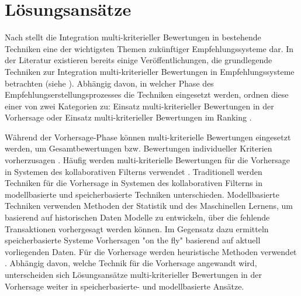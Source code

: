 
\section{Lösungsansätze}
\label{ch:erweiterungen:loesungen}
Nach \textcite[S. 853]{adomavicius:4:inbook} stellt die Integration multi-kriteriel\-ler Bewertungen in bestehende Techniken eine der wichtigsten Themen zukünftiger Empfehlungssysteme dar.
In der Literatur existieren bereits einige Veröffentlichungen, die grundlegende Techniken zur Integration multi-kriterieller Bewertungen in Empfehlungssysteme betrachten (siehe \cite{adomavicius:inproceedings:2}\cite{adomavicius:4:inbook}\cite{recommenderSystems:2016}).
Abhängig davon, in welcher Phase des Empfehlungserstellungsprozesses die Techniken eingesetzt werden, ordnen \textcite[S. 854f.]{adomavicius:4:inbook} diese einer von zwei Kategorien zu: Einsatz multi-kriterieller Bewertungen in der Vorhersage oder Einsatz multi-kriterieller Bewertungen im Ranking \cite[S. 854]{adomavicius:4:inbook}.

Während der Vorhersage-Phase können multi-kriterielle Bewertungen eingesetzt werden, um Gesamtbewertungen bzw. Bewertungen individueller Kriterien vorherzusagen \cite[S. 854]{adomavicius:4:inbook}.
Häufig werden multi-kriterielle Bewertungen für die Vorhersage in Systemen des kollaborativen Filterns verwendet \cite[S. 850]{adomavicius:4:inbook}.
Traditionell werden Techniken für die Vorhersage in Systemen des kollaborativen Filterns in modellbasierte und speicherbasierte Techniken unterschieden.
Modellbasierte Techniken verwenden Methoden der Statistik und des Maschinellen Lernens, um basierend auf historischen Daten Modelle zu entwickeln, über die fehlende Transaktionen vorhergesagt werden können.
Im Gegensatz dazu ermitteln speicherbasierte Systeme Vorhersagen "on the fly" \cite[S. 855]{adomavicius:4:inbook} basierend auf aktuell vorliegenden Daten.
Für die Vorhersage werden heuristische Methoden verwendet \cite[S. 855]{adomavicius:4:inbook}.
Abhängig davon, welche Technik für die Vorhersage angewandt wird, unterscheiden sich Lösungsansätze multi-kriterieller Bewertungen in der Vorhersage weiter in speicherbasierte- und modellbasierte Ansätze.

